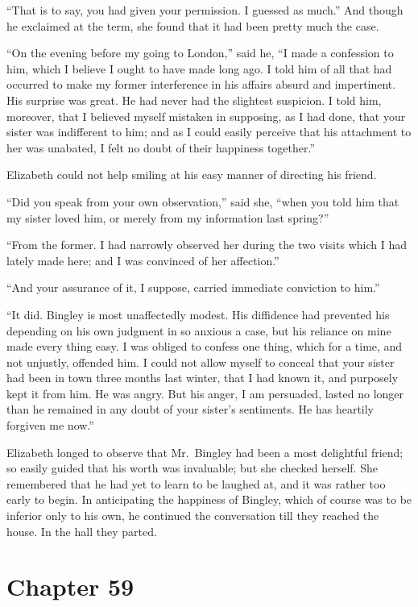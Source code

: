 ``That is to say, you had given your permission.  I guessed as
much.''  And though he exclaimed at the term, she found that it
had been pretty much the case.

``On the evening before my going to London,'' said he, ``I made a
confession to him, which I believe I ought to have made long
ago.  I told him of all that had occurred to make my former
interference in his affairs absurd and impertinent.  His
surprise was great.  He had never had the slightest suspicion.
I told him, moreover, that I believed myself mistaken in
supposing, as I had done, that your sister was indifferent to
him; and as I could easily perceive that his attachment to her
was unabated, I felt no doubt of their happiness together.''

Elizabeth could not help smiling at his easy manner of
directing his friend.

``Did you speak from your own observation,'' said she, ``when
you told him that my sister loved him, or merely from my
information last spring?''

``From the former.  I had narrowly observed her during the two
visits which I had lately made here; and I was convinced of her
affection.''

``And your assurance of it, I suppose, carried immediate
conviction to him.''

``It did.  Bingley is most unaffectedly modest.  His diffidence
had prevented his depending on his own judgment in so anxious
a case, but his reliance on mine made every thing easy.  I
was obliged to confess one thing, which for a time, and not
unjustly, offended him.  I could not allow myself to conceal
that your sister had been in town three months last winter,
that I had known it, and purposely kept it from him.  He was
angry.  But his anger, I am persuaded, lasted no longer than
he remained in any doubt of your sister's sentiments.  He has
heartily forgiven me now.''

Elizabeth longed to observe that Mr.\ Bingley had been a most
delightful friend; so easily guided that his worth was
invaluable; but she checked herself.  She remembered that he
had yet to learn to be laughed at, and it was rather too early
to begin.  In anticipating the happiness of Bingley, which of
course was to be inferior only to his own, he continued the
conversation till they reached the house.  In the hall they
parted.



\chapter{Chapter 59}


